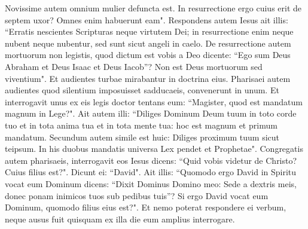 \begin{biblechapter}
\verse Novissime autem omnium mulier defuncta est. 
\verse In resurrectione ergo cuius erit de septem uxor? Omnes enim habuerunt eam". 
\verse Respondens autem Iesus ait illis: “Erratis nescientes Scripturas neque virtutem Dei; 
\verse in resurrectione enim neque nubent neque nubentur, sed sunt sicut angeli in caelo. 
\verse De resurrectione autem mortuorum non legistis, quod dictum est vobis a Deo dicente: 
\verse “Ego sum Deus Abraham et Deus Isaac et Deus Iacob”? Non est Deus mortuorum sed viventium". 
\verse Et audientes turbae mirabantur in doctrina eius. 
\verse Pharisaei autem audientes quod silentium imposuisset sadducaeis, convenerunt in unum. 
\verse Et interrogavit unus ex eis legis doctor tentans eum: 
\verse “Magister, quod est mandatum magnum in Lege?". 
\verse Ait autem illi: “Diliges Dominum Deum tuum in toto corde tuo et in tota anima tua et in tota mente tua: 
\verse hoc est magnum et primum mandatum. 
\verse Secundum autem simile est huic: Diliges proximum tuum sicut teipsum. 
\verse In his duobus mandatis universa Lex pendet et Prophetae". 
\verse Congregatis autem pharisaeis, interrogavit eos Iesus 
\verse dicens: “Quid vobis videtur de Christo? Cuius filius est?". Dicunt ei: “David". 
\verse Ait illis: “Quomodo ergo David in Spiritu vocat eum Dominum dicens: 
\verse “Dixit Dominus Domino meo: Sede a dextris meis, donec ponam inimicos tuos sub pedibus tuis”? 
\verse Si ergo David vocat eum Dominum, quomodo filius eius est?". 
\verse Et nemo poterat respondere ei verbum, neque ausus fuit quisquam ex illa die eum amplius interrogare. 
\end{biblechapter}

